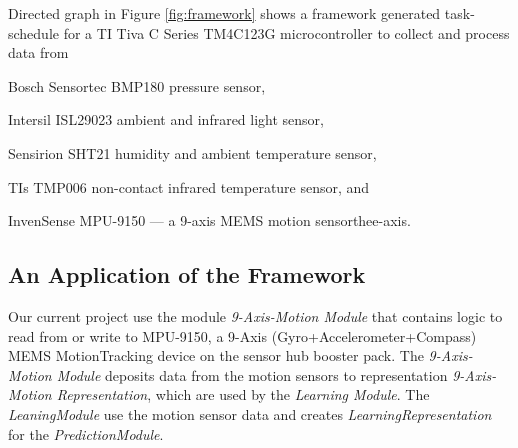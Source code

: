 \documentclass{IEEEtran}
\begin{document}
Directed graph in Figure \ref{fig:framework} shows a framework generated task-schedule for  a TI Tiva C Series TM4C123G microcontroller to collect and process data from \begin{inparaenum}[($i$)] \item Bosch Sensortec BMP180 pressure sensor, \item Intersil ISL29023 ambient and infrared light sensor, \item Sensirion SHT21 humidity and ambient temperature sensor,  \item  TIs TMP006 non-contact infrared temperature sensor, and \item InvenSense 
MPU-9150 --- a 9-axis MEMS motion sensorthee-axis. \end{inparaenum}



\subsection{An Application of the Framework}

Our current project use 
the module {\em 
9-Axis-Motion Module} that contains logic to read from or write to MPU-9150, a 9-Axis 
(Gyro+Accelerometer+Compass) MEMS MotionTracking device on the sensor hub booster pack. The {\em 
9-Axis-Motion Module} deposits data from the motion sensors to 
representation {\em 9-Axis-Motion Representation}, which are used by the {\em 
Learning Module}. The {\em LeaningModule} use the motion sensor data and creates {\em LearningRepresentation} for the {\em PredictionModule}. 
\end{document}
